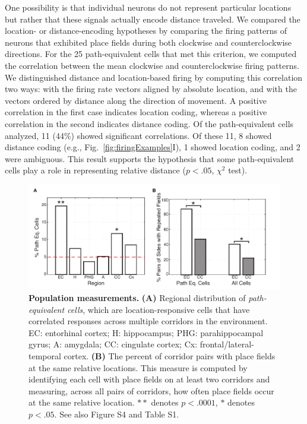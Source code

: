 One possibility is that individual neurons do not represent particular locations but rather that these  signals actually encode distance traveled.  We compared the location- or distance-encoding hypotheses  by comparing the firing patterns of neurons that exhibited place fields during both clockwise and counterclockwise directions. For the 25 path-equivalent cells that met this criterion, we computed the correlation between the mean clockwise and counterclockwise firing patterns. We distinguished distance and location-based firing by computing this correlation two ways: with the firing rate vectors aligned by absolute location, and with the vectors ordered by distance along the direction of movement. A positive correlation in the first case indicates location coding, whereas a positive correlation in the second indicates distance coding. Of the path-equivalent cells analyzed, 11 (44\%) showed significant correlations. Of these 11, 8 showed distance coding  (e.g., Fig.~\ref{fig:firingExamples}I), 1 showed location coding, and 2 were ambiguous. This result supports the hypothesis that some path-equivalent cells  play a role in representing relative distance  ($p<.05$, $\chi^2$ test).




\begin{figure}
\centering
\includegraphics[width=.99\textwidth]{./tex/linearGrids/figs/Figure4}
\caption[Population measurements]{\textbf{Population measurements.}  \textbf{(A)} Regional distribution of \emph{path-equivalent cells}, which are location-responsive cells that have correlated responses across multiple corridors in the environment. EC: entorhinal cortex; H: hippocampus; PHG: parahippocampal gyrus; A: amygdala; CC: cingulate cortex; Cx: frontal/lateral-temporal cortex. \textbf{(B)} The percent of corridor pairs with place fields at the same relative locations.  This measure is computed by identifying each cell with place fields on at least two corridors and measuring, across all pairs of corridors, how often place fields occur at the same relative location.  $**$ denotes $p<.0001$, $*$ denotes $p<.05$. See also Figure S4 and Table S1.}
\label{fig:population}
\end{figure}


